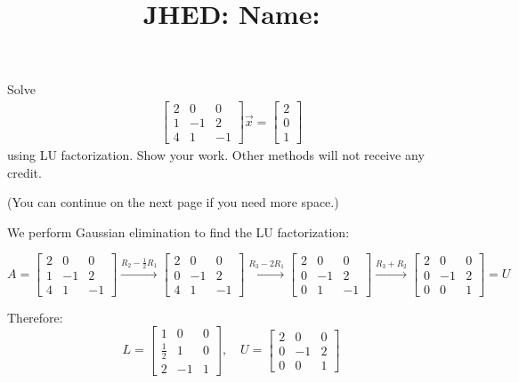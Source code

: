 \documentclass[reqno, answers]{exam}
\title{\normalsize{
  JHED: \underline{\hspace{4cm}} \hspace{1em} Name: \underline{\hspace{9cm}}}
   }
\author{}
\date{}
\begin{document}
\maketitle
\vspace{-2cm} %

\begin{questions}

\question Solve 
  \begin{align*}
    \begin{bmatrix} 2 & 0 & 0 \\ 1 & -1 & 2 \\ 4 & 1 & -1 \end{bmatrix} \vec{x} = \begin{bmatrix} 2 \\ 0 \\ 1 \end{bmatrix}
  \end{align*}
  using LU factorization. Show your work. Other methods will not receive any credit.

  (You can continue on the next page if you need more space.)
  \begin{solution}
    We perform Gaussian elimination to find the LU factorization:
    
    $$A = \begin{bmatrix} 2 & 0 & 0 \\ 1 & -1 & 2 \\ 4 & 1 & -1 \end{bmatrix} \xrightarrow{R_2 - \frac{1}{2}R_1} \begin{bmatrix} 2 & 0 & 0 \\ 0 & -1 & 2 \\ 4 & 1 & -1 \end{bmatrix} \xrightarrow{R_3 - 2R_1} \begin{bmatrix} 2 & 0 & 0 \\ 0 & -1 & 2 \\ 0 & 1 & -1 \end{bmatrix} \xrightarrow{R_3 + R_2} \begin{bmatrix} 2 & 0 & 0 \\ 0 & -1 & 2 \\ 0 & 0 & 1 \end{bmatrix} = U$$

    Therefore:
    $$L = \begin{bmatrix} 1 & 0 & 0 \\ \frac{1}{2} & 1 & 0 \\ 2 & -1 & 1 \end{bmatrix}, \quad U = \begin{bmatrix} 2 & 0 & 0 \\ 0 & -1 & 2 \\ 0 & 0 & 1 \end{bmatrix}$$


\end{solution}
\end{questions}
\end{document}
